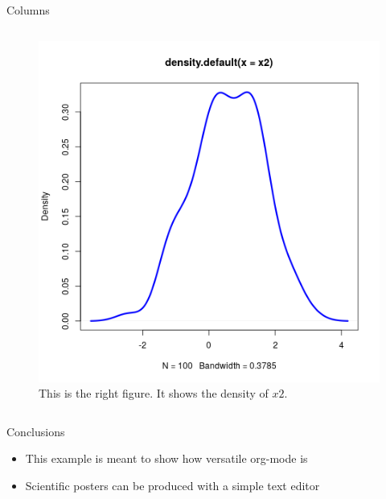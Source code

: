 \documentclass[final]{beamer}
\begin{document}
\begin{frame}[fragile,label={sec:org88bd8a7}]{}
\begin{columns}
\begin{column}[t]{0.45\columnwidth}
\begin{block}{Columns}
\begin{columns}
\begin{column}[T]{0.48\columnwidth}
\captionsetup{justification=justified,width=.85\linewidth}
\begin{figure}[htbp]
\centering
\includegraphics[width=.9\linewidth]{4r.png}
\caption{\label{fig:org5b61d7c}
This is the right figure. It shows the density of \(x2\).}
\end{figure}
\end{column}
\end{columns}
\end{block}

\begin{block}{Conclusions}
\begin{itemize}
\item This example is meant to show how versatile org-mode is
\item Scientific posters can be produced with a simple text editor
\end{itemize}
\end{block}
\end{column}
\end{columns}
\end{frame}
\end{document}
